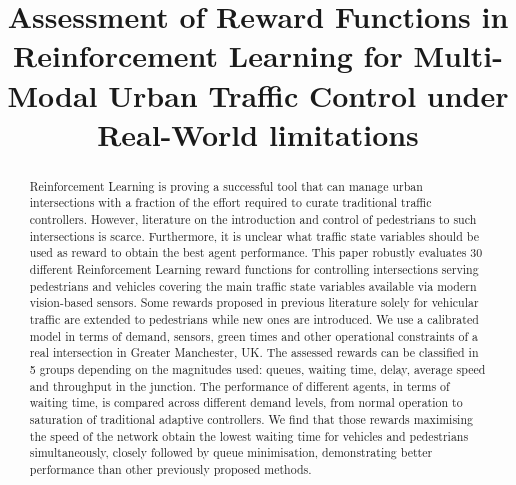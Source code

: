 \documentclass[conference]{IEEEtran}
\begin{document}
\title{Assessment of Reward Functions in Reinforcement Learning for Multi-Modal Urban Traffic Control under Real-World limitations}


\author{
\and
{}
}

\maketitle

\begin{abstract}
Reinforcement Learning is proving a successful tool that can manage urban intersections with a fraction of the effort required to curate traditional traffic controllers.
However, literature on the introduction and control of pedestrians to such intersections is scarce.
Furthermore, it is unclear what traffic state variables should be used as reward to obtain the best agent performance.
This paper robustly evaluates 30 different Reinforcement Learning reward functions for controlling intersections serving pedestrians and vehicles covering the main traffic state variables available via modern vision-based sensors.
Some rewards proposed in previous literature solely for vehicular traffic are extended to pedestrians while new ones are introduced.
We use a calibrated model in terms of demand, sensors, green times and other operational constraints of a real intersection in Greater Manchester, UK.
The assessed rewards can be classified in 5 groups depending on the magnitudes used: queues, waiting time, delay, average speed and throughput in the junction.
The performance of different agents, in terms of waiting time, is compared across different demand levels, from normal operation to saturation of traditional adaptive controllers.
We find that those rewards maximising the speed of the network obtain the lowest waiting time for vehicles and pedestrians simultaneously, closely followed by queue minimisation, demonstrating better performance than other previously proposed methods.
\end{abstract}
\end{document}

